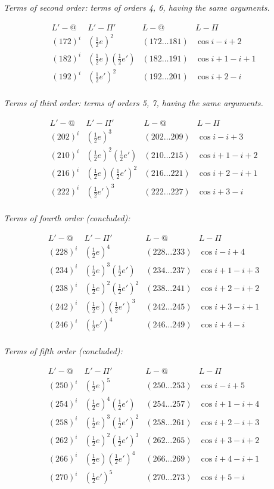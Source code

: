 \documentclass[11pt,a4paper]{article}
\theoremstyle{plain}
\theoremstyle{definition}
\theoremstyle{remark}
\begin{document}
\newpage

\textit{Terms of second order: terms of orders 4, 6, having the same arguments.}

\[
\begin{array}{cccc}
L'-@ & L'-\Pi' & L-@ & L-\Pi \\
(172)^{i} & (\tfrac12 e)^{2} & (172\dots181) & \cos i-i+2 \\
(182)^{i} & (\tfrac12 e)(\tfrac12 e') & (182\dots191) & \cos i+1-i+1 \\
(192)^{i} & (\tfrac12 e')^{2} & (192\dots201) & \cos i+2-i \\
\end{array}
\]

\textit{Terms of third order: terms of orders 5, 7, having the same arguments.}

\[
\begin{array}{cccc}
L'-@ & L'-\Pi' & L-@ & L-\Pi \\
(202)^{i} & (\tfrac12 e)^{3} & (202\dots209) & \cos i-i+3 \\
(210)^{i} & (\tfrac12 e)^{2}(\tfrac12 e') & (210\dots215) & \cos i+1-i+2 \\
(216)^{i} & (\tfrac12 e)(\tfrac12 e')^{2} & (216\dots221) & \cos i+2-i+1 \\
(222)^{i} & (\tfrac12 e')^{3} & (222\dots227) & \cos i+3-i \\
\end{array}
\]

\textit{Terms of fourth order (concluded):}

\[
\begin{array}{cccc}
L'-@ & L'-\Pi' & L-@ & L-\Pi \\
(228)^{i} & (\tfrac12 e)^{4} & (228\dots233) & \cos i-i+4 \\
(234)^{i} & (\tfrac12 e)^{3}(\tfrac12 e') & (234\dots237) & \cos i+1-i+3 \\
(238)^{i} & (\tfrac12 e)^{2}(\tfrac12 e')^{2} & (238\dots241) & \cos i+2-i+2 \\
(242)^{i} & (\tfrac12 e)(\tfrac12 e')^{3} & (242\dots245) & \cos i+3-i+1 \\
(246)^{i} & (\tfrac12 e')^{4} & (246\dots249) & \cos i+4-i \\
\end{array}
\]

\textit{Terms of fifth order (concluded):}

\[
\begin{array}{cccc}
L'-@ & L'-\Pi' & L-@ & L-\Pi \\
(250)^{i} & (\tfrac12 e)^{5} & (250\dots253) & \cos i-i+5 \\
(254)^{i} & (\tfrac12 e)^{4}(\tfrac12 e') & (254\dots257) & \cos i+1-i+4 \\
(258)^{i} & (\tfrac12 e)^{3}(\tfrac12 e')^{2} & (258\dots261) & \cos i+2-i+3 \\
(262)^{i} & (\tfrac12 e)^{2}(\tfrac12 e')^{3} & (262\dots265) & \cos i+3-i+2 \\
(266)^{i} & (\tfrac12 e)(\tfrac12 e')^{4} & (266\dots269) & \cos i+4-i+1 \\
(270)^{i} & (\tfrac12 e')^{5} & (270\dots273) & \cos i+5-i \\
\end{array}
\]
\end{document}
